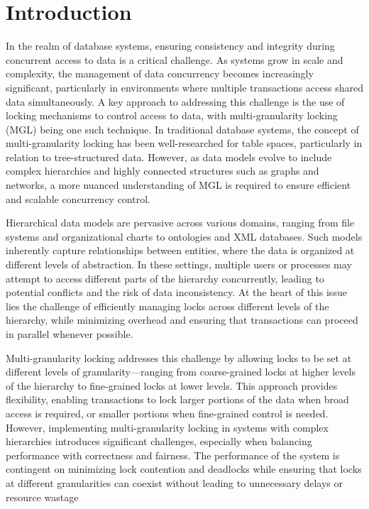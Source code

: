 %

\chapter{Introduction}

In the realm of database systems, ensuring consistency and integrity during concurrent access to data is a critical challenge. 
As systems grow in scale and complexity, the management of data concurrency becomes increasingly significant, particularly in environments where multiple transactions access shared data simultaneously. 
A key approach to addressing this challenge is the use of locking mechanisms to control access to data, with multi-granularity locking (MGL) being one such technique.
In traditional database systems, the concept of multi-granularity locking has been well-researched for table spaces, particularly in relation to tree-structured data. 
However, as data models evolve to include complex hierarchies and highly connected structures such as graphs and networks, a more nuanced understanding of MGL is required to ensure efficient and scalable concurrency control.

Hierarchical data models are pervasive across various domains, ranging from file systems and organizational charts to ontologies and XML databases. 
Such models inherently capture relationships between entities, where the data is organized at different levels of abstraction. 
In these settings, multiple users or processes may attempt to access different parts of the hierarchy concurrently, leading to potential conflicts and the risk of data inconsistency. 
At the heart of this issue lies the challenge of efficiently managing locks across different levels of the hierarchy, while minimizing overhead and ensuring that transactions can proceed in parallel whenever possible.

Multi-granularity locking addresses this challenge by allowing locks to be set at different levels of granularity—ranging from coarse-grained locks at higher levels of the hierarchy to fine-grained locks at lower levels. 
This approach provides flexibility, enabling transactions to lock larger portions of the data when broad access is required, or smaller portions when fine-grained control is needed. 
However, implementing multi-granularity locking in systems with complex hierarchies introduces significant challenges, especially when balancing performance with correctness and fairness. 
The performance of the system is contingent on minimizing lock contention and deadlocks while ensuring that locks at different granularities can coexist without leading to unnecessary delays or resource wastage


